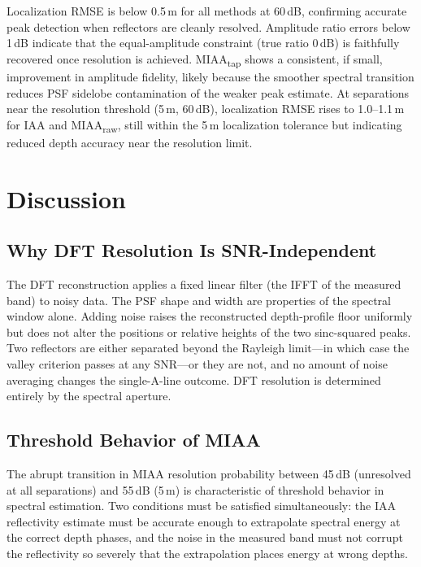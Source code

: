 \documentclass[conference]{IEEEtran}
\begin{document}
Localization RMSE is below 0.5\,\textmu m for all methods at 60\,dB,
confirming accurate peak detection when reflectors are cleanly resolved.
Amplitude ratio errors below 1\,dB indicate that the equal-amplitude
constraint (true ratio 0\,dB) is faithfully recovered once resolution
is achieved. MIAA\textsubscript{tap} shows a consistent, if small,
improvement in amplitude fidelity, likely because the smoother spectral
transition reduces PSF sidelobe contamination of the weaker peak
estimate. At separations near the resolution threshold (5\,\textmu m,
60\,dB), localization RMSE rises to 1.0--1.1\,\textmu m for IAA and
MIAA\textsubscript{raw}, still within the 5\,\textmu m localization
tolerance but indicating reduced depth accuracy near the resolution
limit.

\section{Discussion}

\subsection{Why DFT Resolution Is SNR-Independent}

The DFT reconstruction applies a fixed linear filter (the IFFT of the
measured band) to noisy data. The PSF shape and width are properties
of the spectral window alone. Adding noise raises the reconstructed
depth-profile floor uniformly but does not alter the positions or
relative heights of the two sinc-squared peaks. Two reflectors are
either separated beyond the Rayleigh limit---in which case the valley
criterion passes at any SNR---or they are not, and no amount of noise
averaging changes the single-A-line outcome. DFT resolution is
determined entirely by the spectral aperture.

\subsection{Threshold Behavior of MIAA}

The abrupt transition in MIAA resolution probability between 45\,dB
(unresolved at all separations) and 55\,dB (5\,\textmu m) is
characteristic of threshold behavior in spectral estimation. Two
conditions must be satisfied simultaneously: the IAA reflectivity
estimate must be accurate enough to extrapolate spectral energy at the
correct depth phases, and the noise in the measured band must not
corrupt the reflectivity so severely that the extrapolation places
energy at wrong depths.
\end{document}
